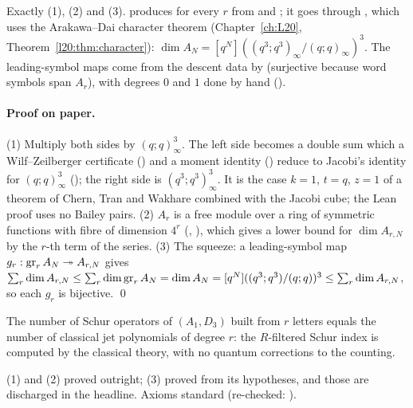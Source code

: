 \begin{dictionary}
Exactly (1), (2) and (3).  produces  for every $r$ from  and ;
it goes through , which uses the Arakawa--Dai character theorem 
(Chapter~\ref{ch:L20}, Theorem~\ref{l20:thm:character}): $\dim A_N=[q^N]((q^3;q^3)_\infty/(q;q)_\infty)^3$. The leading-symbol maps come from the descent data
by  (surjective because word symbols span $A_r$), with degrees $0$ and $1$ done by hand
().
\end{dictionary}

\paragraph{Proof on paper.} (1) Multiply both sides by $(q;q)_\infty^3$. The left side becomes a double sum which a Wilf--Zeilberger certificate
() and a moment identity () reduce to Jacobi's identity for $(q;q)_\infty^3$ (); the right side is
$(q^3;q^3)_\infty^3$. It is the case $k=1$, $t=q$, $z=1$ of a theorem of Chern, Tran and Wakhare combined with the Jacobi cube; the Lean proof uses no Bailey
pairs. (2) $A_r$ is a free module over a ring of symmetric functions with fibre of dimension $4^r$ (, ), which gives a lower
bound for $\dim A_{r,N}$ by the $r$-th term of the series. (3) The squeeze: a leading-symbol map $g_r:\operatorname{gr}_rA_N\twoheadrightarrow A_{r,N}$ gives
$\sum_r\dim A_{r,N}\le\sum_r\dim\operatorname{gr}_rA_N=\dim A_N=[q^N]((q^3;q^3)/(q;q))^3\le\sum_r\dim A_{r,N}$, so each $g_r$ is bijective. \qed

\begin{physics}
The number of Schur operators of $(A_1,D_3)$ built from $r$ letters equals the number of classical jet polynomials of degree $r$: the $R$-filtered
Schur index is computed by the classical theory, with no quantum corrections to the counting.
\end{physics}

\begin{status}
(1) and (2) proved outright; (3) proved from its hypotheses, and those are discharged in the headline. Axioms standard (re-checked:
).
\end{status}

